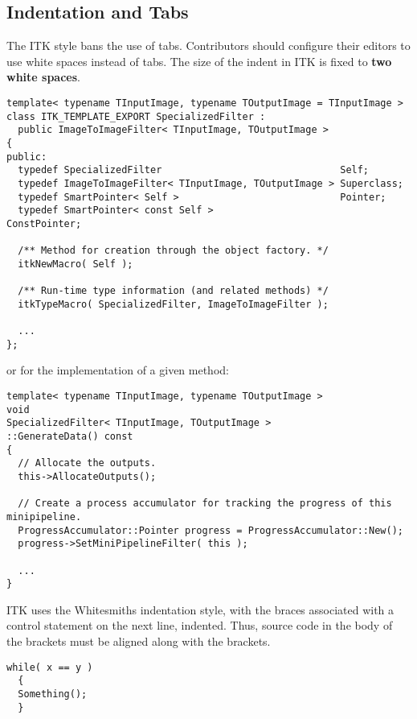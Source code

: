 \subsection{Indentation and Tabs}
\label{subsec:IndentationAndTabs}

The ITK style bans the use of tabs. Contributors should configure their editors
to use white spaces instead of tabs. The size of the indent in ITK is fixed to
\textbf{two white spaces}.

\small
\begin{verbatim}
template< typename TInputImage, typename TOutputImage = TInputImage >
class ITK_TEMPLATE_EXPORT SpecializedFilter :
  public ImageToImageFilter< TInputImage, TOutputImage >
{
public:
  typedef SpecializedFilter                               Self;
  typedef ImageToImageFilter< TInputImage, TOutputImage > Superclass;
  typedef SmartPointer< Self >                            Pointer;
  typedef SmartPointer< const Self >                      ConstPointer;

  /** Method for creation through the object factory. */
  itkNewMacro( Self );

  /** Run-time type information (and related methods) */
  itkTypeMacro( SpecializedFilter, ImageToImageFilter );

  ...
};
\end{verbatim}
\normalsize

or for the implementation of a given method:

\small
\begin{verbatim}
template< typename TInputImage, typename TOutputImage >
void
SpecializedFilter< TInputImage, TOutputImage >
::GenerateData() const
{
  // Allocate the outputs.
  this->AllocateOutputs();

  // Create a process accumulator for tracking the progress of this minipipeline.
  ProgressAccumulator::Pointer progress = ProgressAccumulator::New();
  progress->SetMiniPipelineFilter( this );

  ...
}
\end{verbatim}
\normalsize

ITK uses the Whitesmiths indentation style, with the braces associated with
a control statement on the next line, indented. Thus, source code in the body of
the brackets must be aligned along with the brackets.

\small
\begin{verbatim}
while( x == y )
  {
  Something();
  }
\end{verbatim}
\normalsize


